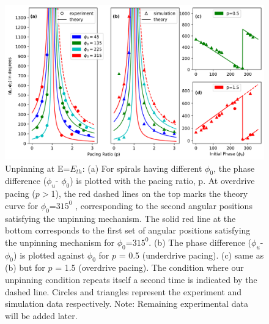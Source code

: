 \documentclass[%
 preprint,
 amsmath,amssymb,
 aps,
]{revtex4-2}
\begin{document}
\begin{figure}[H]
    \centering
    \includegraphics[scale=0.8]{Fig2.png}
    \caption{Unpinning at E=$E_{th}$: (a) For spirals having different ${\phi}_0$,  the phase difference (${\phi}_u$- ${\phi}_0$) is plotted with the pacing ratio, p. At overdrive pacing ($p>$1), the red dashed lines on the top marks the theory curve for ${\phi}_0$=$315^0$ , corresponding to the second angular positions satisfying the unpinning mechanism. The solid red line at the bottom corresponds to the first set of angular positions satisfying the unpinning mechanism for ${\phi}_0$=$315^0$.
    (b) The phase difference (${\phi}_u$- ${\phi}_0$) is plotted against ${\phi}_0$ for $p$ = 0.5 (underdrive pacing). (c) same as (b) but for $p$ = 1.5 (overdrive pacing). The condition where our unpinning condition repeats itself a second time is indicated by the dashed line. Circles and triangles represent the experiment and simulation data respectively.  
    Note: Remaining experimental data will be added later.
    }
    \label{fig:unpinning_Eth}
\end{figure}

\end{document}
